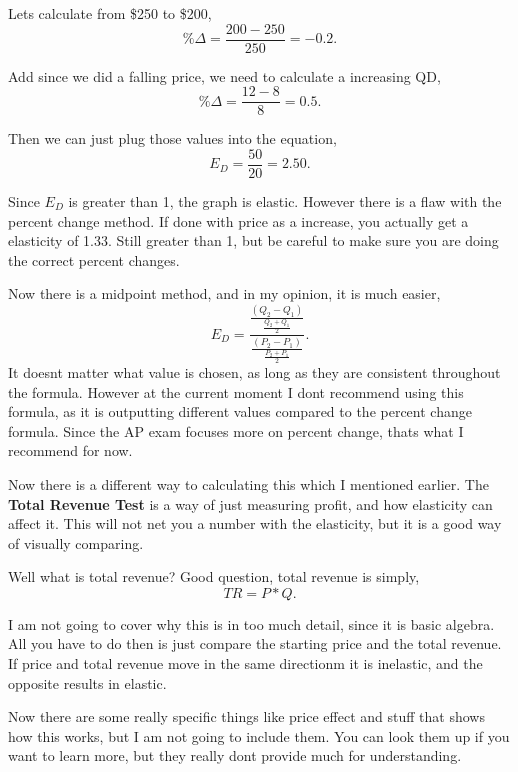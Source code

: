 Lets calculate from \$250 to \$200,
\[
    \%\Delta = \frac{200-250}{250} = -0.2
.\] 

Add since we did a falling price, we need to calculate a increasing QD,
\[
    \%\Delta = \frac{12-8}{8} = 0.5
.\] 

Then we can just plug those values into the equation, 
\[
    E_D = \frac{50}{20} = 2.50
.\] 

Since $E_D$ is greater than 1, the graph is elastic. However there is a flaw with the percent change method. If done with price as a increase, you actually get a elasticity of 1.33. Still greater than 1, but be careful to make sure you are doing the correct percent changes. 

Now there is a midpoint method, and in my opinion, it is much easier,
 \[
     E_D = \frac{\frac{(Q_2-Q_1)}{\frac{Q_2+Q_1}{2}}}{\frac{(P_2-P_1)}{\frac{P_2+P_1}{2}}}
.\] 
It doesnt matter what value is chosen, as long as they are consistent throughout the formula. However at the current moment I dont recommend using this formula, as it is outputting different values compared to the percent change formula. Since the AP exam focuses more on percent change, thats what I recommend for now. 

Now there is a different way to calculating this which I mentioned earlier. The \textbf{Total Revenue Test} is a way of just measuring profit, and how elasticity can affect it. This will not net you a number with the elasticity, but it is a good way of visually comparing. 

Well what is total revenue? Good question, total revenue is simply, 
\[
TR = P * Q
.\] 

I am not going to cover why this is in too much detail, since it is basic algebra. All you have to do then is just compare the starting price and the total revenue. If price and total revenue move in the same directionm it is inelastic, and the opposite results in elastic.

Now there are some really specific things like price effect and stuff that shows how this works, but I am not going to include them. You can look them up if you want to learn more, but they really dont provide much for understanding. 
